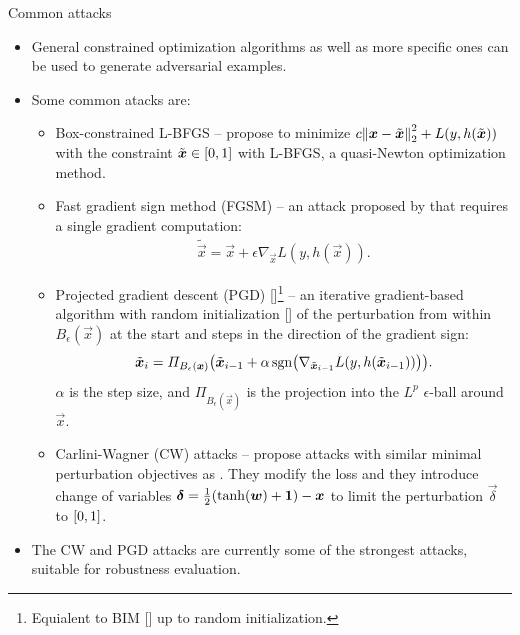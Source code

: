 \documentclass{beamer}
\newcommand{\citet}[1]{{\color{citecolor}\relscale{0.8}\textcite{#1}}}
\newcommand{\citep}[1]{{\color{citecolor}\relscale{0.8}[\textcite{#1}]}}
\begin{document}
\begin{frame}[allowframebreaks=0.9]{Common attacks}
	\begin{itemize}
		\item General constrained optimization algorithms as well as more specific ones can be used to generate adversarial examples.
		\item Some common atacks are:
		\begin{itemize}
			\item Box-constrained L-BFGS -- \citet{Szegedy:2013:IPNN} propose to minimize $c\enVert{\vec x -\tilde{\vec x}}_2^2+L(y,h(\tilde{\vec x}))$ with the constraint $\tilde{\vec x}\in\intcc{0,1}$ with L-BFGS, a quasi-Newton optimization method.
			\item Fast gradient sign method (FGSM) -- an attack proposed by \citet{Goodfellow:2014:EHAE} that requires a single gradient computation:
			\begin{align}
			\tilde{\vec x} = \vec x + \epsilon\nabla_{\vec x} L(y,h(\vec x)) \text{.}
			\end{align} 
			\item Projected gradient descent (PGD) \citep{Madry:2017:TDLMRAA}\footnote[frame]{Equialent to BIM \citep{Kurakin:2016:AMLS} up to random initialization.} -- an iterative gradient-based algorithm with random initialization \citep{Madry:2017:TDLMRAA} of the perturbation from within $B_\epsilon(\vec x)$ at the start and steps in the direction of the gradient sign:
			\begin{equation} \label{eq:pgd}
			\tilde{\vec x}_i = \Pi_{B_\epsilon(\vec x)} \del{\tilde{\vec x}_{i-1} + \alpha\sgn\del{\nabla_{\tilde{\vec x}_{i-1}} L(y,h(\tilde{\vec x}_{i-1}))}} \text{.}
			\end{equation}
			$\alpha$ is the step size, and $\Pi_{B_\epsilon(\vec x)}$ is the projection into the $L^p$ $\epsilon$-ball around $\vec x$.
			\item Carlini-Wagner (CW) attacks -- \citet{Carlini:2017:TERNN} propose attacks with similar minimal perturbation objectives as \citet{Szegedy:2013:IPNN} 
			. They modify the loss and they introduce change of variables $\vec\delta=\frac{1}{2}\del{\tanh\del{\vec w} + \cvec 1} - \vec x$ to limit the perturbation $\vec\delta$ to $\intcc{0,1}$. 
		\end{itemize}
		\item The CW and PGD attacks are currently some of the strongest attacks, suitable for robustness evaluation.		
	\end{itemize}
\end{frame}
\end{document}
